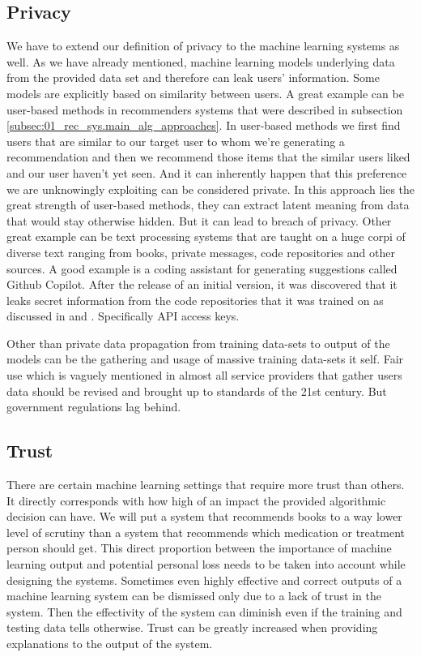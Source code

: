 \subsection{Privacy}
We have to extend our definition of privacy to the machine learning systems as well. As we have already mentioned, machine learning models underlying data from the provided data set and therefore can leak users' information. Some models are explicitly based on similarity between users. A great example can be user-based methods in recommenders systems that were described in subsection \ref{subsec:01_rec_sys.main_alg_approaches}. In user-based methods we first find users that are similar to our target user to whom we're generating a recommendation and then we recommend those items that the similar users liked and our user haven't yet seen. And it can inherently happen that this preference we are unknowingly exploiting can be considered private. In this approach lies the great strength of user-based methods, they can extract latent meaning from data that would stay otherwise hidden. But it can lead to breach of privacy. Other great example can be text processing systems that are taught on a huge corpi of diverse text ranging from books, private messages, code repositories and other sources. A good example is a coding assistant for generating suggestions called Github Copilot. After the release of an initial version, it was discovered that it leaks secret information from the code repositories that it was trained on as discussed in \cite{github_copilot_leaks_2} and \cite{github_copilot_leaks}. Specifically API access keys.

Other than private data propagation from training data-sets to output of the models can be the gathering and usage of massive training data-sets it self. Fair use which is vaguely mentioned in almost all service providers that gather users data should be revised and brought up to standards of the 21st century. But government regulations lag behind.

\subsection{Trust}
There are certain machine learning settings that require more trust than others. It directly corresponds with how high of an impact the provided algorithmic decision can have. We will put a system that recommends books to a way lower level of scrutiny than a system that recommends which medication or treatment person should get. This direct proportion between the importance of machine learning output and potential personal loss needs to be taken into account while designing the systems. Sometimes even highly effective and correct outputs of a machine learning system can be dismissed only due to a lack of trust in the system. Then the effectivity of the system can diminish even if the training and testing data tells otherwise. Trust can be greatly increased when providing explanations to the output of the system.

